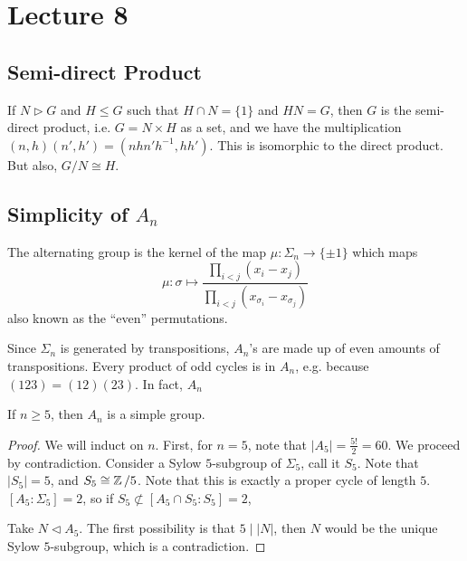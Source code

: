 \section{Lecture 8}
\subsection{Semi-direct Product}
\begin{theorem}
    If $N \triangleright G$ and $H \le G$ such that $H \cap N = \{1\}$ and $HN = G$,
    then $G$ is the semi-direct product, i.e. $G = N \times H$ as a set,
    and we have the multiplication $(n, h)(n', h') = (n h n' h^{-1}, h h')$. This is isomorphic to the direct product.
    But also, $G / N \cong H$.
\end{theorem}

\subsection{Simplicity of $A_n$}
\begin{definition}
    The alternating group is the kernel of the map $\mu: \Sigma_n \to \{\pm 1\}$
    which maps
    \[ \mu: \sigma \mapsto \frac{\prod_{i < j} (x_i - x_j)}{\prod_{i < j} (x_{\sigma_i} - x_{\sigma_j})} \]
    also known as the ``even'' permutations.
\end{definition}
Since $\Sigma_n$ is generated by transpositions, $A_n$'s are made up of
even amounts of transpositions. Every product of odd cycles is in $A_n$, e.g. because $(1 2 3) = (1 2)(2 3)$.
In fact, $A_n$ 
\begin{theorem}
    If $n \ge 5$, then $A_n$ is a simple group.
    \begin{proof}
        We will induct on $n$. First, for $n = 5$, note that $|A_5| = \frac{5!}{2} = 60$. 
        We proceed by contradiction. Consider a Sylow $5$-subgroup of $\Sigma_5$, call it $S_5$.
        Note that $|S_5| = 5$, and $S_5 \cong \operatorname{\mathbb{Z}}/5$.
        Note that this is exactly a proper cycle of length $5$. $[A_5 : \Sigma_5] = 2$, so
        if $S_5 \not\subset [A_5 \cap S_5 : S_5] = 2$,

        
        Take $N \triangleleft A_5$.
        The first possibility is that $5 \mid |N|$, then $N$ would be the unique Sylow $5$-subgroup, which is a contradiction.
    \end{proof}
\end{theorem}

